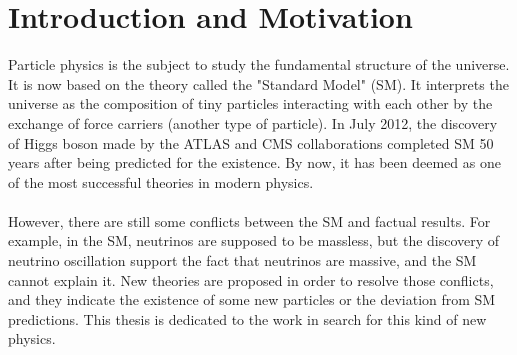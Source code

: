 \chapter{Introduction and Motivation}
\label{Chap:intro}
Particle physics is the subject to study the fundamental structure of the universe. It is now based on the theory called the "Standard Model" (SM). It interprets the universe as the composition of tiny particles interacting with each other by the exchange of force carriers (another type of particle).  In July 2012, the discovery of Higgs boson made by the ATLAS and CMS collaborations \cite{HIGG-2012-27,CMS-HIG-12-028} completed SM 50 years after being predicted for the existence. By now, it has been deemed as one of the most successful theories in modern physics.
\\
\\
However, there are still some conflicts between the SM and factual results. For example, in the SM, neutrinos are supposed to be massless, but the discovery of neutrino oscillation support the fact that neutrinos are massive, and the SM cannot explain it. New theories are proposed in order to resolve those conflicts, and they indicate the existence of some new particles or the deviation from SM predictions. This thesis is dedicated to the work in search for this kind of new physics.
